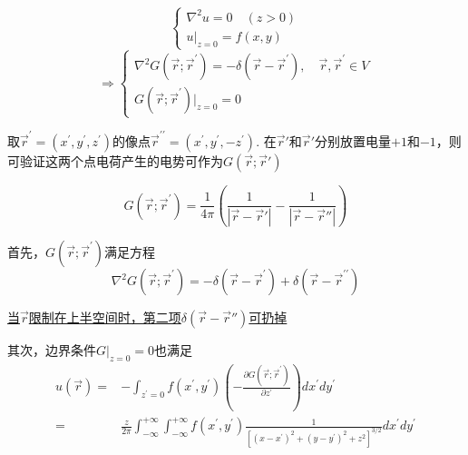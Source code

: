 \begin{ex}[$V=$上半空间$z>0$]
    $$\begin{cases}\nabla^{2}u=0\quad(z>0)\\u|_{z=0}=f(x,y)\end{cases}$$
    $$\Rightarrow\begin{cases}
        \nabla^{2}G(\vec{r};\vec{r}^{\prime})=-\delta(\vec{r}-\vec{r}^{\prime}),\quad\vec{r},\vec{r}^{\prime}\in V\\
        G(\vec{r};\vec{r}^{\prime})|_{z=0}=0
    \end{cases}$$

    
    
    取$\vec{r}^{\prime}=(x^{\prime},y^{\prime},z^{\prime})$的像点$\vec{r}^{\prime\prime}=(x^{\prime},y^{\prime},-z^{\prime})$. 
    在$\vec{r}'$和$\vec{r}'$分别放置电量$+1$和$-1$，则可验证这两个点电荷产生的电势可作为$G(\vec{r};\vec{r}')$
    \begin{prf}
        $$G(\vec{r};\vec{r}^{\prime})=\frac{1}{4\pi}(\frac{1}{|\vec{r}-\vec{r}'|}-\frac{1}{|\vec{r}-\vec{r}''|})$$

        \noindent 首先，$G(\vec{r};\vec{r}^{\prime})$满足方程
        $$\nabla^{2}G(\vec{r};\vec{r}^{\prime})=-\delta(\vec{r}-\vec{r}^{\prime})+\delta(\vec{r}-\vec{r}^{\prime\prime})$$ 
        
        \underline{当$\vec{r}$限制在上半空间时，第二项$\delta(\vec{r}-\vec{r}'')$可扔掉}

        \noindent 其次，边界条件$G|_{z=0}=0$也满足
        $$\begin{aligned}
            u(\vec{r})=&-\int_{z^{\prime}=0}f(x^{\prime},y^{\prime})(-\frac{\partial G(\vec{r};\vec{r}^{\prime})}{\partial z^{\prime}})dx^{\prime}dy^{\prime}\\
            =&\frac{z}{2\pi}\int_{-\infty}^{+\infty}\int_{-\infty}^{+\infty}f(x^{\prime},y^{\prime})\frac{1}{[(x-x^{\prime})^{2}+(y-y^{\prime})^{2}+z^{2}]^{3/2}}dx^{\prime}dy^{\prime}
        \end{aligned}$$
    \end{prf}
\end{ex}

